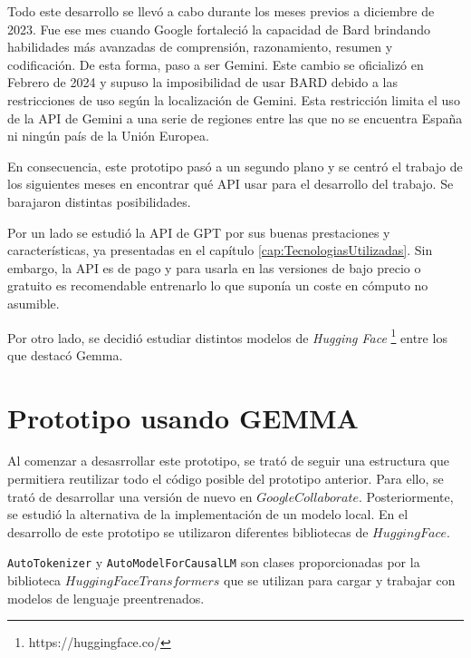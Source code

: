 Todo este desarrollo se llevó a cabo durante los meses previos a diciembre de 2023. Fue ese mes cuando Google fortaleció la capacidad de Bard brindando habilidades más avanzadas de comprensión, razonamiento, resumen y codificación. De esta forma, paso a ser Gemini. Este cambio se oficializó en Febrero de 2024 y supuso la imposibilidad de usar BARD debido a las restricciones de uso según la localización de Gemini. Esta restricción limita el uso de la API de Gemini a una serie de regiones entre las que no se encuentra España ni ningún país de la Unión Europea.

En consecuencia, este prototipo pasó a un segundo plano y se centró el trabajo de los siguientes meses en encontrar qué API usar para el desarrollo del trabajo. Se barajaron distintas posibilidades. 

Por un lado se estudió la API de GPT por sus buenas prestaciones y características, ya presentadas en el capítulo \ref{cap:TecnologiasUtilizadas}. Sin embargo, la API es de pago y para usarla en las versiones de bajo precio o gratuito es recomendable entrenarlo lo que suponía un coste en cómputo no asumible. 

Por otro lado, se decidió estudiar distintos modelos de \textit{Hugging Face} \footnote{https://huggingface.co/} entre los que destacó Gemma. 

\section{Prototipo usando GEMMA}
Al comenzar a desasrrollar este prototipo, se trató de seguir una estructura que permitiera reutilizar todo el código posible del prototipo anterior. Para ello, se trató de desarrollar una versión de nuevo en $Google Collaborate$. Posteriormente, se estudió la alternativa de la implementación de un modelo local. En el desarrollo de este prototipo se utilizaron diferentes bibliotecas de $Hugging Face$.

\texttt{AutoTokenizer} y \texttt{AutoModelForCausalLM} son clases proporcionadas por la biblioteca $Hugging Face Transformers$ que se utilizan para cargar y trabajar con modelos de lenguaje preentrenados.

